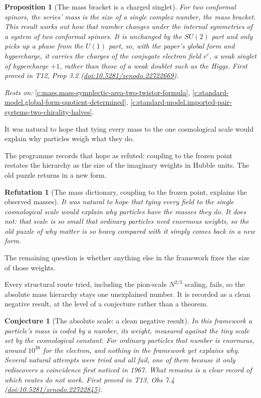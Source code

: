 \documentclass[11pt]{article}
\newtheorem{proposition}[theorem]{Proposition}
\newtheorem{conjecture}[theorem]{Conjecture}
\newtheorem{refutation}[theorem]{Refutation}
\theoremstyle{definition}
\theoremstyle{plain}
\begin{document}
\begin{proposition}[The mass bracket is a charged singlet]\label{c:standard-model.mass-bracket-charged-singlet}
For two conformal spinors, the series' mass is the size of a single complex number, the mass bracket. This result works out how that number changes under the internal symmetries of a system of two conformal spinors. It is unchanged by the $SU(2)$ part and only picks up a phase from the $U(1)$ part, so, with the paper's global form and hypercharge, it carries the charges of the conjugate electron field $e^{c}$, a weak singlet of hypercharge $+1$, rather than those of a weak doublet such as the Higgs.
\emph{First proved in} T12, Prop 3.2 (\href{https://doi.org/10.5281/zenodo.22722669}{doi:10.5281/zenodo.22722669}).
\end{proposition}
\noindent\emph{Rests on:} \ref{c:mass.mass-symplectic-area-two-twistor-formula}, \ref{c:standard-model.global-form-quotient-determined}, \ref{c:standard-model.imported-pair-systems-two-chirality-halves}.

It was natural to hope that tying every mass to the one cosmological scale would explain why particles weigh what they do.

The programme records that hope as refuted: coupling to the frozen point restates the hierarchy as the size of the imaginary weights in Hubble units. The old puzzle returns in a new form.

\begin{refutation}[The mass dictionary, coupling to the frozen point, explains the observed masses]\label{c:refuted.the-mass-dictionary-coupling-to-the-frozen-point}
It was natural to hope that tying every field to the single cosmological scale would explain why particles have the masses they do. It does not: that scale is so small that ordinary particles need enormous weights, so the old puzzle of why matter is so heavy compared with it simply comes back in a new form.
\end{refutation}

The remaining question is whether anything else in the framework fixes the size of those weights.

Every structural route tried, including the pion-scale $N^{2/3}$ scaling, fails, so the absolute mass hierarchy stays one unexplained number. It is recorded as a clean negative result, at the level of a conjecture rather than a theorem.

\begin{conjecture}[The absolute scale: a clean negative result]\label{c:families.absolute-scale-clean-negative-result}
In this framework a particle's mass is coded by a number, its weight, measured against the tiny scale set by the cosmological constant. For ordinary particles that number is enormous, around $10^{38}$ for the electron, and nothing in the framework yet explains why. Several natural attempts were tried and all fail, one of them because it only rediscovers a coincidence first noticed in 1967. What remains is a clear record of which routes do not work.
\emph{First proved in} T13, Obs 7.4 (\href{https://doi.org/10.5281/zenodo.22722845}{doi:10.5281/zenodo.22722845}).
\end{conjecture}
\end{document}
